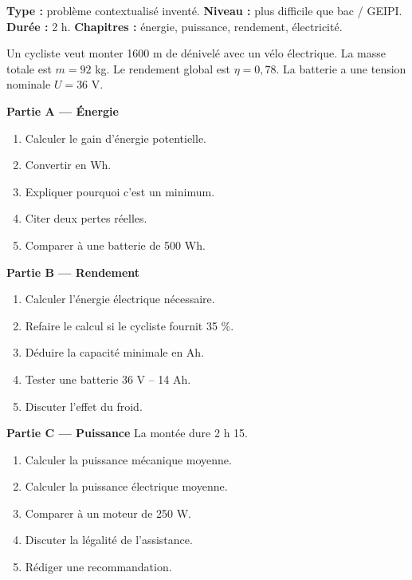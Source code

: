 \documentclass[11pt,a4paper]{article}
\begin{document}
\hypertarget{PC-LONG-07}{}
\begin{difficile}
\textbf{Type :} problème contextualisé inventé.  
\textbf{Niveau :} plus difficile que bac / GEIPI.  
\textbf{Durée :} 2 h.  
\textbf{Chapitres :} énergie, puissance, rendement, électricité.

Un cycliste veut monter 1600 m de dénivelé avec un vélo électrique. La masse totale est $m=92$ kg. Le rendement global est $\eta=0{,}78$. La batterie a une tension nominale $U=36$ V.

\textbf{Partie A — Énergie}
\begin{enumerate}
  \item Calculer le gain d'énergie potentielle.
  \item Convertir en Wh.
  \item Expliquer pourquoi c'est un minimum.
  \item Citer deux pertes réelles.
  \item Comparer à une batterie de 500 Wh.
\end{enumerate}

\textbf{Partie B — Rendement}
\begin{enumerate}
  \item Calculer l'énergie électrique nécessaire.
  \item Refaire le calcul si le cycliste fournit 35 \%.
  \item Déduire la capacité minimale en Ah.
  \item Tester une batterie 36 V -- 14 Ah.
  \item Discuter l'effet du froid.
\end{enumerate}

\textbf{Partie C — Puissance}
La montée dure 2 h 15.
\begin{enumerate}
  \item Calculer la puissance mécanique moyenne.
  \item Calculer la puissance électrique moyenne.
  \item Comparer à un moteur de 250 W.
  \item Discuter la légalité de l'assistance.
  \item Rédiger une recommandation.
\end{enumerate}
\end{difficile}
\end{document}
